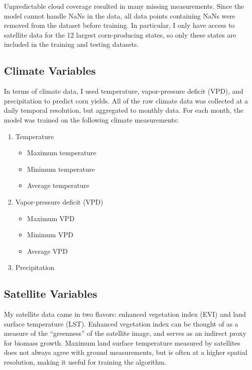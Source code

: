 \documentclass[letterpaper]{article}
\begin{document}
Unpredictable cloud coverage resulted in many missing measurements. Since the model cannot handle NaNs in the data, all data points containing NaNs were removed from the dataset before training. In particular, I only have access to satellite data for the 12 largest corn-producing states, so only these states are included in the training and testing datasets.

\subsection{Climate Variables}

In terms of climate data, I used temperature, vapor-pressure deficit (VPD), and precipitation to predict corn yields. All of the raw climate data was collected at a daily temporal resolution, but aggregated to monthly data. For each month, the model was trained on the following climate measurements:

\begin{enumerate}
    \item Temperature
    \begin{itemize}
        \item Maximum temperature
        \item Minimum temperature
        \item Average temperature
    \end{itemize}
    \item Vapor-pressure deficit (VPD)
    \begin{itemize}
        \item Maximum VPD
        \item Minimum VPD
        \item Average VPD
    \end{itemize}
    \item Precipitation
\end{enumerate}

\subsection{Satellite Variables}

My satellite data came in two flavors: enhanced vegetation index (EVI) and land surface temperature (LST). Enhanced vegetation index can be thought of as a measure of the ``greenness'' of the satellite image, and serves as an indirect proxy for biomass growth. Maximum land surface temperature measured by satellites does not always agree with ground measurements, but is often at a higher spatial resolution, making it useful for training the algorithm.
\end{document}
